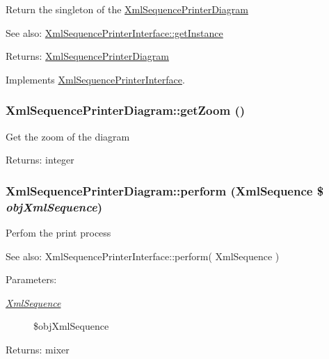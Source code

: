 Return the singleton of the \hyperlink{class_xml_sequence_printer_diagram}{XmlSequencePrinterDiagram}

\begin{Desc}
\item[See also:]\hyperlink{interface_xml_sequence_printer_interface_d488a9fe62e4e3018e482d31497d5e99}{XmlSequencePrinterInterface::getInstance} \end{Desc}
\begin{Desc}
\item[Returns:]\hyperlink{class_xml_sequence_printer_diagram}{XmlSequencePrinterDiagram} \end{Desc}


Implements \hyperlink{interface_xml_sequence_printer_interface_d488a9fe62e4e3018e482d31497d5e99}{XmlSequencePrinterInterface}.\hypertarget{class_xml_sequence_printer_diagram_71fbe6074cf81fab4eee271f16a6f189}{
\subsubsection[{getZoom}]{\setlength{\rightskip}{0pt plus 5cm}XmlSequencePrinterDiagram::getZoom ()}}
\label{class_xml_sequence_printer_diagram_71fbe6074cf81fab4eee271f16a6f189}


Get the zoom of the diagram

\begin{Desc}
\item[Returns:]integer \end{Desc}
\hypertarget{class_xml_sequence_printer_diagram_a94b897abb072d1d895c2e63dfa066d2}{
\subsubsection[{perform}]{\setlength{\rightskip}{0pt plus 5cm}XmlSequencePrinterDiagram::perform ({\bf XmlSequence} \$ {\em objXmlSequence})}}
\label{class_xml_sequence_printer_diagram_a94b897abb072d1d895c2e63dfa066d2}


Perfom the print process

\begin{Desc}
\item[See also:]XmlSequencePrinterInterface::perform( XmlSequence ) \end{Desc}
\begin{Desc}
\item[Parameters:]
\begin{description}
\item[{\em \hyperlink{class_xml_sequence}{XmlSequence}}]\$objXmlSequence \end{description}
\end{Desc}
\begin{Desc}
\item[Returns:]mixer \end{Desc}


